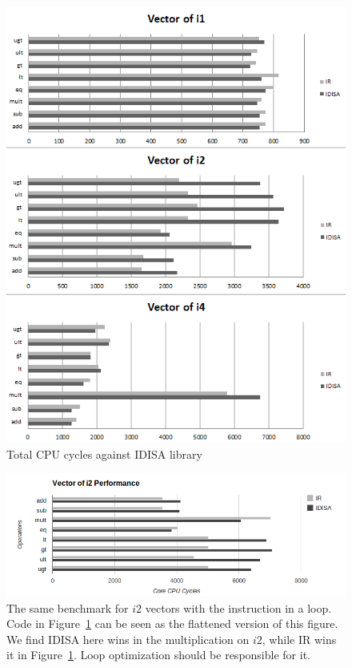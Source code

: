 \begin{figure}[ht!]
\centering
\includegraphics[width=140mm]{draw/cpu_cycles_vector.png}
\caption[Total CPU Cycles Against IDISA Library]{Total CPU cycles against IDISA library}
\label{figure:cpu_cycles_vector}
\end{figure}

\begin{figure}[ht!]
\centering
\includegraphics[width=140mm]{draw/loop_vector_i2.png}
\caption[Vector Of $i2$ Tested In A Loop]{The same benchmark for $i2$ vectors with the instruction in a loop. Code in Figure~\ref{figure:cpu_cycles_vector} can be seen as the flattened version of this figure. We find IDISA here wins in the multiplication on $i2$, while IR wins it in Figure~\ref{figure:cpu_cycles_vector}. Loop optimization should be responsible for it.}
\label{figure:loop_vector_i2}
\end{figure}

